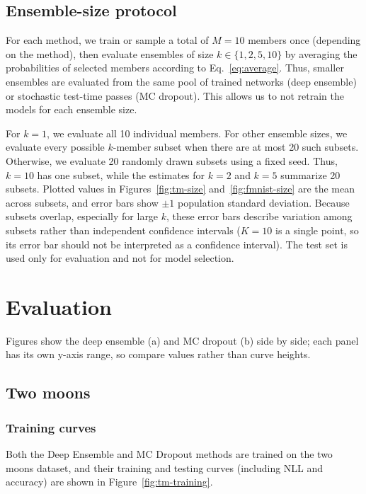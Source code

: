 \documentclass[10pt]{article}
\begin{document}
\subsection{Ensemble-size protocol}

For each method, we train or sample a total of \(M=10\) members once (depending on the method), then evaluate ensembles of size \(k\in\{1,2,5,10\}\) by averaging the probabilities of selected members according to Eq.~\eqref{eq:average}.
Thus, smaller ensembles are evaluated from the same pool
of trained networks (deep ensemble) or stochastic test-time passes (MC dropout). 
This allows us to not retrain the models for each ensemble size.

For \(k=1\), we evaluate all 10 individual members. For other ensemble sizes, we evaluate every possible \(k\)-member subset when there are at most 20 such
subsets.
Otherwise, we evaluate 20 randomly drawn subsets using a fixed seed.
Thus, \(k=10\) has one subset, while the estimates for \(k=2\) and \(k=5\) summarize 20 subsets. 
Plotted values in Figures~\ref{fig:tm-size} and~\ref{fig:fmnist-size} are the mean across subsets, and error bars show \(\pm1\) population standard deviation. 
Because subsets overlap, especially for large \(k\), these error bars describe variation among subsets
rather than independent confidence intervals ($K=10$ is a single point, so its error bar should not be interpreted as a confidence interval).
The test set is used only for evaluation and not for model selection.


\section{Evaluation}
Figures show the deep ensemble (a) and MC dropout (b) side by side; each panel has its own y-axis range, so compare values rather than curve heights.

\subsection{Two moons}

\subsubsection{Training curves}

Both the Deep Ensemble and MC Dropout methods are trained on the two moons dataset, and their training and testing curves (including NLL and accuracy) are shown in Figure~\ref{fig:tm-training}. 
\end{document}

